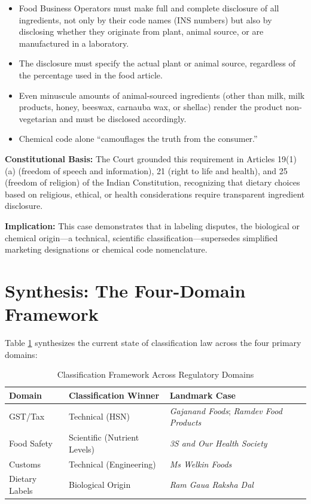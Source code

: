 \documentclass[12pt,a4paper]{article}
\begin{document}
\begin{itemize}
\item Food Business Operators must make full and complete disclosure of all ingredients, not only by their code names (INS numbers) but also by disclosing whether they originate from plant, animal source, or are manufactured in a laboratory.
\item The disclosure must specify the actual plant or animal source, regardless of the percentage used in the food article.
\item Even minuscule amounts of animal-sourced ingredients (other than milk, milk products, honey, beeswax, carnauba wax, or shellac) render the product non-vegetarian and must be disclosed accordingly.
\item Chemical code alone ``camouflages the truth from the consumer.''
\end{itemize}

\textbf{Constitutional Basis:} The Court grounded this requirement in Articles 19(1)(a) (freedom of speech and information), 21 (right to life and health), and 25 (freedom of religion) of the Indian Constitution, recognizing that dietary choices based on religious, ethical, or health considerations require transparent ingredient disclosure.

\textbf{Implication:} This case demonstrates that in labeling disputes, the biological or chemical origin---a technical, scientific classification---supersedes simplified marketing designations or chemical code nomenclature.

\section{Synthesis: The Four-Domain Framework}

Table \ref{tab:domains} synthesizes the current state of classification law across the four primary domains:

\begin{table}[h]
\centering
\caption{Classification Framework Across Regulatory Domains}
\label{tab:domains}
\begin{tabular}{@{}lll@{}}
\toprule
\textbf{Domain} & \textbf{Classification Winner} & \textbf{Landmark Case} \\ \midrule
GST/Tax & Technical (HSN) & \textit{Gajanand Foods}; \textit{Ramdev Food Products} \\
Food Safety & Scientific (Nutrient Levels) & \textit{3S and Our Health Society} \\
Customs & Technical (Engineering) & \textit{Ms Welkin Foods} \\
Dietary Labels & Biological Origin & \textit{Ram Gaua Raksha Dal} \\ \bottomrule
\end{tabular}
\end{table}
\end{document}
